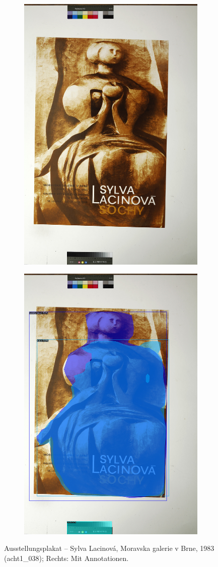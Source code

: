 \documentclass[a4paper,12pt,ngerman]{article}
\begin{document}
\newpage
\begin{landscape}
\begin{figure}[ht]
	\begin{subfigure}[b]{0.5\linewidth}
	\centering
	\includegraphics[height=\linewidth]{Abbildung_37_(acht1_038)}
	\end{subfigure}
	\begin{subfigure}[b]{0.5\linewidth}
	\centering
	\includegraphics[height=\linewidth]{Abbildung_37_(acht1_038)_with_detections}
	\end{subfigure}
	\caption{Ausstellungsplakat -- Sylva Lacinová, Moravska galerie v Brne, 1983 (acht1\_038); Rechts: Mit Annotationen.}
\end{figure}
\end{landscape}
\end{document}
